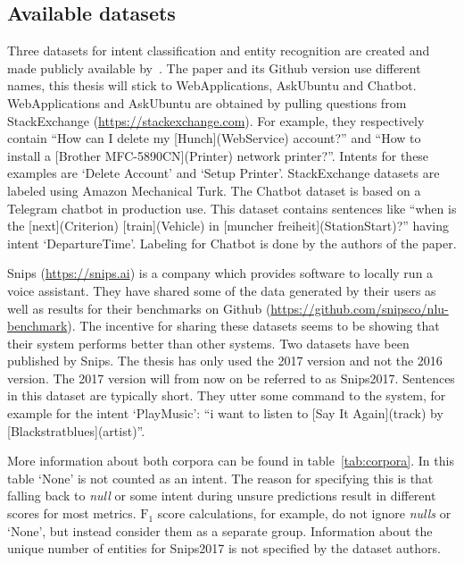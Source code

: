 \subsection{Available datasets}
\label{subsec:available_datasets}
Three datasets for intent classification and entity recognition are created and made publicly available by~\citet{braun2017}.
The paper and its Github version use different names, this thesis will stick to WebApplications, AskUbuntu and Chatbot.
WebApplications and AskUbuntu are obtained by pulling questions from StackExchange (\url{https://stackexchange.com}).
For example, they respectively contain ``How can I delete my [Hunch](WebService) account?'' and ``How to install a [Brother MFC-5890CN](Printer) network printer?''.
Intents for these examples are `Delete Account' and `Setup Printer'.
StackExchange datasets are labeled using Amazon Mechanical Turk.
The Chatbot dataset is based on a Telegram chatbot in production use.
This dataset contains sentences like ``when is the [next](Criterion) [train](Vehicle) in [muncher freiheit](StationStart)?'' having intent `DepartureTime'.
Labeling for Chatbot is done by the authors of the paper.

Snips (\url{https://snips.ai}) is a company which provides software to locally run a voice assistant.
They have shared some of the data generated by their users as well as results for their benchmarks on Github (\url{https://github.com/snipsco/nlu-benchmark}).
The incentive for sharing these datasets seems to be showing that their system performs better than other systems.
Two datasets have been published by Snips.
The thesis has only used the 2017 version and not the 2016 version.
The 2017 version will from now on be referred to as Snips2017.
Sentences in this dataset are typically short.
They utter some command to the system, for example for the intent `PlayMusic': ``i want to listen to [Say It Again](track) by [Blackstratblues](artist)''.

More information about both corpora can be found in table~\ref{tab:corpora}.
In this table `None' is not counted as an intent.
The reason for specifying this is that falling back to \textit{null} or some intent during unsure predictions result in different scores for most metrics.
$\text{F}_1$ score calculations, for example, do not ignore \textit{nulls} or `None', but instead consider them as a separate group.
Information about the unique number of entities for Snips2017 is not specified by the dataset authors.

